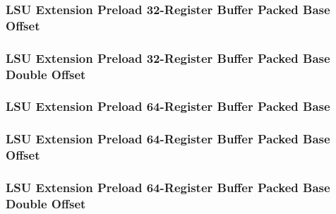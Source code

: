 

\subsubsection[{\small LSU Extension Preload 32-Register Buffer Packed Base Offset}]{LSU Extension Preload 32-Register Buffer Packed Base Offset} \label{sec:format-LSU-XPL32RBB.O}



\subsubsection[{\small LSU Extension Preload 32-Register Buffer Packed Base Double Offset}]{LSU Extension Preload 32-Register Buffer Packed Base Double Offset} \label{sec:format-LSU-XPL32RBB.D}



\subsubsection[{\small LSU Extension Preload 64-Register Buffer Packed Base}]{LSU Extension Preload 64-Register Buffer Packed Base} \label{sec:format-LSU-XPL64RBB}



\subsubsection[{\small LSU Extension Preload 64-Register Buffer Packed Base Offset}]{LSU Extension Preload 64-Register Buffer Packed Base Offset} \label{sec:format-LSU-XPL64RBB.O}



\subsubsection[{\small LSU Extension Preload 64-Register Buffer Packed Base Double Offset}]{LSU Extension Preload 64-Register Buffer Packed Base Double Offset} \label{sec:format-LSU-XPL64RBB.D}

